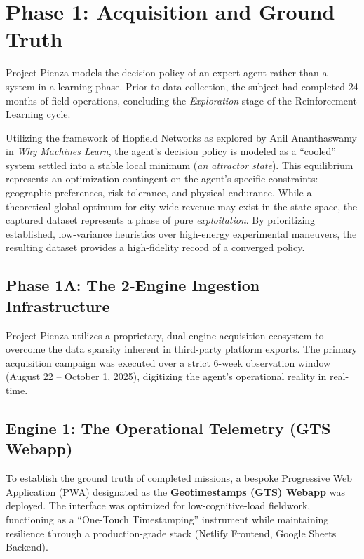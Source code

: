 
\section{Phase 1: Acquisition and Ground Truth}

Project Pienza models the decision policy of an expert agent rather than a system in a learning phase. Prior to data collection, the subject had completed 24 months of field operations, concluding the \textit{Exploration} stage of the Reinforcement Learning cycle. 

Utilizing the framework of Hopfield Networks as explored by Anil Ananthaswamy in \textit{Why Machines Learn},\cite{ananthaswamy2024} the agent’s decision policy is modeled as a ``cooled'' system settled into a stable local minimum (\textit{an attractor state}). This equilibrium represents an optimization contingent on the agent’s specific constraints: geographic preferences, risk tolerance, and physical endurance. While a theoretical global optimum for city-wide revenue may exist in the state space, the captured dataset represents a phase of pure \textit{exploitation}. By prioritizing established, low-variance heuristics over high-energy experimental maneuvers, the resulting dataset provides a high-fidelity record of a converged policy.

\subsection*{Phase 1A: The 2-Engine Ingestion Infrastructure}
Project Pienza utilizes a proprietary, dual-engine acquisition ecosystem to overcome the data sparsity inherent in third-party platform exports. The primary acquisition campaign was executed over a strict 6-week observation window (August 22 -- October 1, 2025), digitizing the agent's operational reality in real-time.

\subsection*{Engine 1: The Operational Telemetry (GTS Webapp)}
To establish the ground truth of completed missions, a bespoke Progressive Web Application (PWA) designated as the \textbf{Geotimestamps (GTS) Webapp} was deployed. The interface was optimized for low-cognitive-load fieldwork, functioning as a ``One-Touch Timestamping'' instrument while maintaining resilience through a production-grade stack (Netlify Frontend, Google Sheets Backend).

